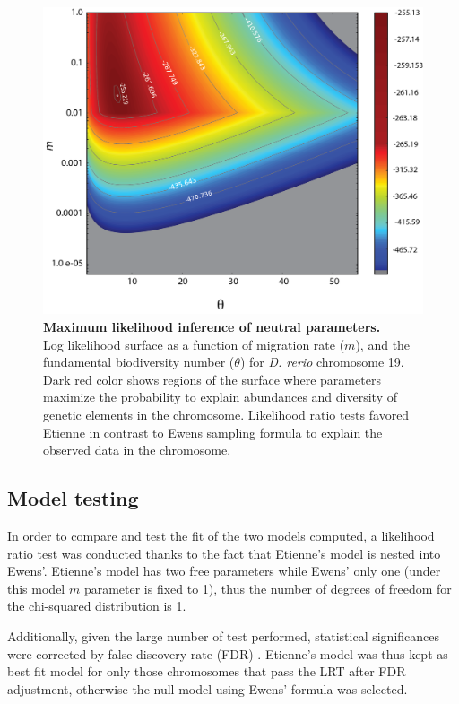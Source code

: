 \begin{figure}[htpb]
\centering 
\includegraphics[width=\textwidth]{tex_source/figures/untb_genomes/lnl_chrom.png}
\caption[Maximum likelihood inference of neutral parameters.]{{\bf Maximum likelihood inference of neutral parameters.}\\ Log likelihood surface as a function of migration rate ($m$), and the fundamental biodiversity number ($\theta$) for \textit{D. rerio} chromosome 19. Dark red color shows regions of the surface where parameters maximize the probability to explain abundances and diversity of genetic elements in the chromosome. Likelihood ratio tests favored Etienne in contrast to Ewens sampling formula to explain the observed data in the chromosome.}
\label{fig:lnl_chrom}
\end{figure}

\subsection{Model testing}

In order to compare and test the fit of the two models computed, a likelihood ratio test \cite{Wilks1938} was conducted thanks to the fact that Etienne's model is nested into Ewens'. Etienne's model has two free parameters while Ewens' only one (under this model $m$ parameter is fixed to 1), thus the number of degrees of freedom for the chi-squared distribution is 1.

Additionally, given the large number of test performed, statistical significances were corrected by false discovery rate (FDR) \cite{Benjamini2001}. Etienne's model was thus kept as best fit model for only those chromosomes that pass the LRT after FDR adjustment, otherwise the null model using Ewens' formula was selected.

